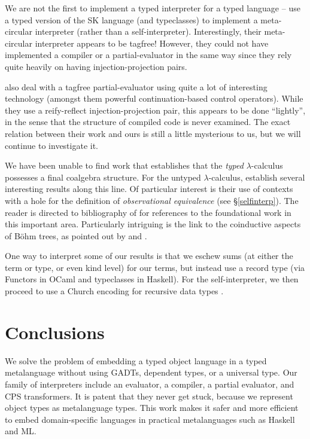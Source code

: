 \documentclass[preprint]{sigplanconf}
\begin{document}
We are not the first to implement a typed interpreter for a typed
language -- \citet{laod93} use a typed version of the SK language
(and typeclasses) to implement a meta-circular interpreter (rather than
a self-interpreter).  Interestingly, their meta-circular interpreter
appears to be tagfree!  However, they could not have implemented a
compiler or a partial-evaluator in the same way since they rely quite
heavily on having injection-projection pairs.

\citet{fiore:nbe-ppdp2002,balat:tdpe-popl2004} also deal with a 
tagfree partial-evaluator using quite a lot of interesting 
technology (amongst them powerful continuation-based control operators).
While they use a reify-reflect injection-projection pair, this appears
to be done ``lightly'', in the sense that the structure of compiled code
is never examined.  The exact relation between their work and ours is 
still a little mysterious to us, but we will continue to investigate it.

We have been unable to find work that establishes that
the \emph{typed} $\lambda$-calculus possesses a final coalgebra structure.
For the untyped $\lambda$-calculus, 
\citet{HonsellLenisa,honsell99coinductive} establish several interesting
results along this line.  Of particular interest is their use of
contexts with a hole \citep[p.13]{honsell99coinductive} for the definition
of \emph{observational equivalence}
(see \S\ref{selfinterp}).  The reader is directed to bibliography of
\citet{honsell99coinductive} for references to the foundational work
in this important area.  Particularly intriguing is the link to the
coinductive aspects of B\"{o}hm trees, as pointed out by
\citet{berarducci-models} and \citet[Example 4.3.4]{jacobs-coalgebra}.

One way to interpret some of our results is that we eschew sums (at either the
term or type, or even kind level) for our terms, but instead use a record type 
(via Functors in OCaml and typeclasses in Haskell).
For the self-interpreter, we then proceed to use a Church encoding for
recursive data types \citep{bohm-automatic}.

\section{Conclusions}\label{conclusion}

We solve the problem of embedding a typed object language in a typed
metalanguage without using GADTs, dependent types, or a universal type.
Our family of interpreters include an evaluator, a compiler, a partial
evaluator, and CPS transformers.  It is patent that they never get stuck,
because we represent object types as metalanguage types.  This work
makes it safer and more efficient to embed domain\hyp specific languages
in practical metalanguages such as Haskell and ML\@.
\end{document}
